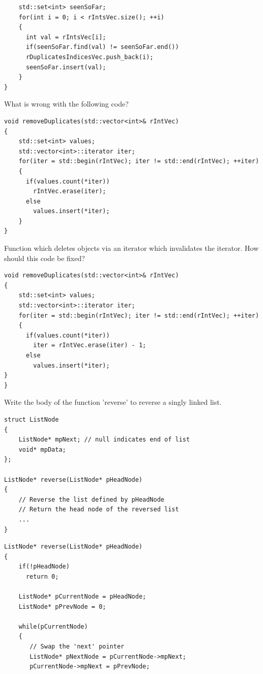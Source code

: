 \documentclass[answers]{exam}
\begin{document}
\begin{questions}
\begin{solution}[.2in]
\begin{lstlisting}
    std::set<int> seenSoFar;
    for(int i = 0; i < rIntsVec.size(); ++i)
    {
      int val = rIntsVec[i];
      if(seenSoFar.find(val) != seenSoFar.end())
      rDuplicatesIndicesVec.push_back(i);
      seenSoFar.insert(val);
    }
}
\end{lstlisting}
\end{solution}

\question What is wrong with the following code?
\begin{lstlisting}
void removeDuplicates(std::vector<int>& rIntVec)
{
    std::set<int> values;
    std::vector<int>::iterator iter;
    for(iter = std::begin(rIntVec); iter != std::end(rIntVec); ++iter)
    {
      if(values.count(*iter))
        rIntVec.erase(iter);
      else
        values.insert(*iter);
    }
}
\end{lstlisting}
\begin{solution}[.2in]
Function which deletes objects via an iterator which invalidates the iterator. How should this code be fixed?
\begin{lstlisting}
void removeDuplicates(std::vector<int>& rIntVec)
{
    std::set<int> values;
    std::vector<int>::iterator iter;
    for(iter = std::begin(rIntVec); iter != std::end(rIntVec); ++iter)
    {
      if(values.count(*iter))
        iter = rIntVec.erase(iter) - 1;
      else
        values.insert(*iter);
}
}
\end{lstlisting}
\end{solution}

\question Write the body of the function 'reverse' to reverse a singly linked list.
\begin{lstlisting}
struct ListNode
{
    ListNode* mpNext; // null indicates end of list
    void* mpData;
};

ListNode* reverse(ListNode* pHeadNode)
{
    // Reverse the list defined by pHeadNode
    // Return the head node of the reversed list
    ...
}
\end{lstlisting}
\begin{solution}[.2in]
\begin{lstlisting}
ListNode* reverse(ListNode* pHeadNode)
{
    if(!pHeadNode)
      return 0;

    ListNode* pCurrentNode = pHeadNode;
    ListNode* pPrevNode = 0;

    while(pCurrentNode)
    {
       // Swap the 'next' pointer
       ListNode* pNextNode = pCurrentNode->mpNext;
       pCurrentNode->mpNext = pPrevNode;


\end{lstlisting}
\end{solution}
\end{questions}
\end{document}
